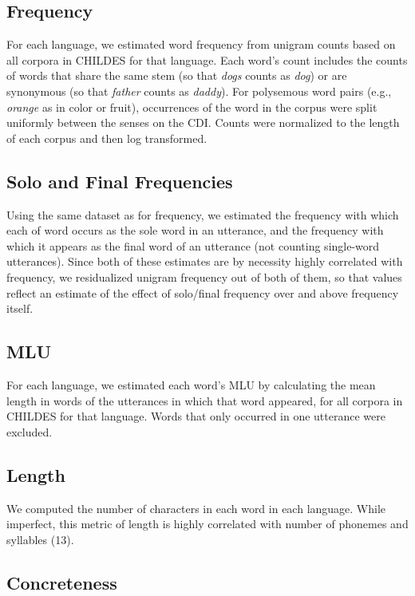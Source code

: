 \documentclass[9pt,twocolumn,twoside]{pnas-new}
\begin{document}
\subsection{Frequency}\label{frequency}

For each language, we estimated word frequency from unigram counts based
on all corpora in CHILDES for that language. Each word's count includes
the counts of words that share the same stem (so that \emph{dogs} counts
as \emph{dog}) or are synonymous (so that \emph{father} counts as
\emph{daddy}). For polysemous word pairs (e.g., \emph{orange} as in
color or fruit), occurrences of the word in the corpus were split
uniformly between the senses on the CDI. Counts were normalized to the
length of each corpus and then log transformed.

\subsection{Solo and Final
Frequencies}\label{solo-and-final-frequencies}

Using the same dataset as for frequency, we estimated the frequency with
which each of word occurs as the sole word in an utterance, and the
frequency with which it appears as the final word of an utterance (not
counting single-word utterances). Since both of these estimates are by
necessity highly correlated with frequency, we residualized unigram
frequency out of both of them, so that values reflect an estimate of the
effect of solo/final frequency over and above frequency itself.

\subsection{MLU}\label{mlu}

For each language, we estimated each word's MLU by calculating the mean
length in words of the utterances in which that word appeared, for all
corpora in CHILDES for that language. Words that only occurred in one
utterance were excluded.

\subsection{Length}\label{length}

We computed the number of characters in each word in each language.
While imperfect, this metric of length is highly correlated with number
of phonemes and syllables (13).

\subsection{Concreteness}\label{concreteness}
\end{document}
